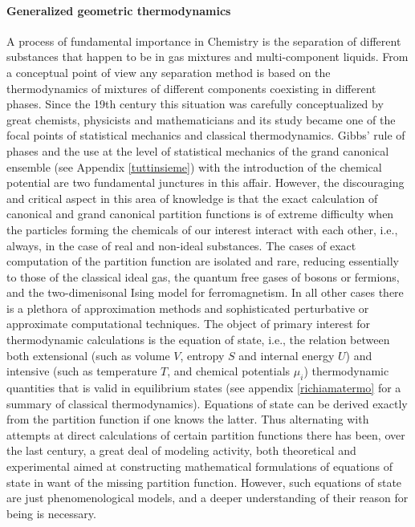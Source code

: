 \documentclass[10pt,a4paper]{article}
\begin{document}
\paragraph{Generalized geometric thermodynamics}
A process of fundamental importance in Chemistry  is the separation of different substances that happen to be in gas mixtures and multi-component liquids. From a conceptual point of view any separation method is based on the thermodynamics of mixtures of different components coexisting in different phases. Since the 19th century this situation was carefully conceptualized by great chemists, physicists and mathematicians and its study became one of the focal points of statistical mechanics and classical thermodynamics. Gibbs' rule of phases and the use at the level of statistical mechanics of the grand canonical ensemble (see Appendix \ref{tuttinsieme}) with the introduction of the chemical potential are two fundamental junctures in this affair. However, the discouraging and critical aspect in this area of knowledge is that the exact calculation of canonical and grand canonical partition functions is of extreme difficulty when the particles forming the chemicals of our interest interact with each other, i.e., always, in the case of real and non-ideal substances. The cases of exact computation of the partition function are isolated and rare, reducing essentially to those of the classical ideal gas, the quantum free gases of bosons or fermions, and the two-dimenisonal Ising model for ferromagnetism. In all other cases there is a plethora of
approximation methods and sophisticated perturbative or approximate computational techniques. The object of primary interest for thermodynamic calculations is the equation of state, i.e., the relation between both extensional (such
as volume $V$, entropy $S$ and internal energy $U$) and intensive (such as temperature $T$, and chemical potentials $\mu_i$) thermodynamic quantities that is valid in equilibrium states (see appendix \ref{richiamatermo} for a summary of classical thermodynamics). Equations of state can be derived exactly from the partition function if one knows the latter.
Thus alternating with attempts at direct calculations of certain partition functions there has been, over the last century, a great deal of modeling activity, both theoretical and experimental aimed at constructing mathematical formulations of equations of state in want of the missing partition function.
However, such equations of state  are just phenomenological models, and a deeper
understanding of their reason for being is  necessary.
\end{document}
